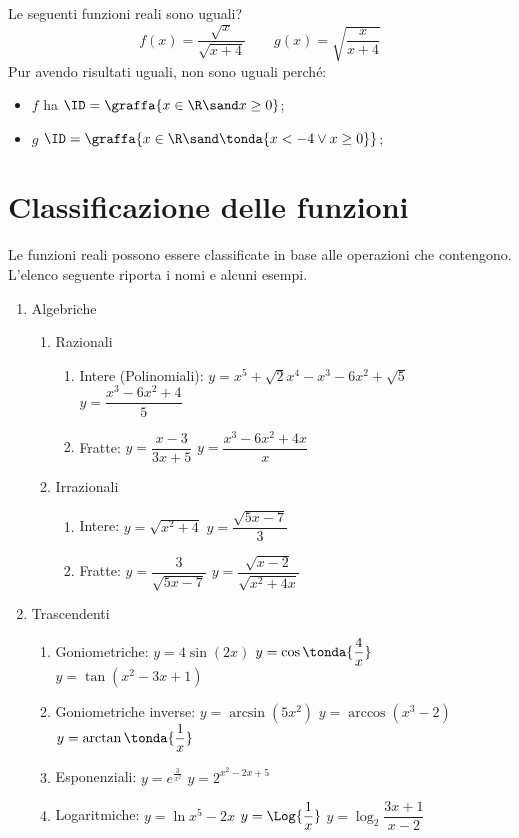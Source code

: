 \begin{esempio}
Le seguenti funzioni reali sono uguali?
\[f(x)=\frac{\sqrt{x}}{\sqrt{x+4}} \qquad g(x)=\sqrt{\frac{x}{x+4}}\]
Pur avendo risultati uguali, non sono uguali perché:
\begin{itemize}[nosep]
\item \(f\) ha 
\(\ID =\graffa{x \in \R \sand x \geq 0}\);
\item \(g\) 
\(\ID =\graffa{x \in \R \sand \tonda{x < -4 \lor x \geq 0}}\);
\end{itemize}
\end{esempio}

\section{Classificazione delle funzioni}

Le funzioni reali possono essere classificate in base alle operazioni che 
contengono.
L'elenco seguente riporta i nomi e alcuni esempi.

\begin{enumerate}
\item Algebriche
  \begin{enumerate}[label*=\arabic*.]
  \item Razionali
    \begin{enumerate}[label*=\arabic*.]
    \item Intere (Polinomiali): \quad 
    \(y = x^5 +\sqrt{2}x^4 -x^3-6x^2 +\sqrt{5}\) \qquad 
    \(y = \dfrac{x^3-6x^2 +4}{5}\) 
    \item Fratte: \quad
    \(y = \dfrac{x -3}{3x+5}\) \qquad 
    \(y = \dfrac{x^3-6x^2 +4x}{x}\) 
    \end{enumerate}
  \item Irrazionali
    \begin{enumerate}[label*=\arabic*.]
    \item Intere: \quad 
    \(y = \sqrt{x^2 +4}\) \qquad 
    \(y = \dfrac{\sqrt{5x-7}}{3}\) 
    \item Fratte: \quad
    \(y = \dfrac{3}{\sqrt{5x-7}}\) \qquad 
    \(y = \dfrac{\sqrt{x-2}}{\sqrt{x^2 +4x}}\) 
    \end{enumerate}
  \end{enumerate}
\item Trascendenti
  \begin{enumerate}[label*=\arabic*.]
  \item Goniometriche: \quad
  \(y = 4 \sin(2 x)\) \qquad
  \(y = \cos\tonda{\dfrac{4}{x}}\) \qquad
  \(y = \tan(x^2 -3x +1)\) 
  \item Goniometriche inverse: \quad
  \(y = \arcsin(5 x^2)\) \quad
  \(y = \arccos(x^3-2)\) \quad
  \(y = \arctan\tonda{\dfrac{1}{x}}\) 
  \item Esponenziali: \quad
  \(y = e^{\frac{3}{x^2}}\) \qquad
  \(y = 2^{x^2-2x+5}\) \qquad
  \item Logaritmiche: \quad
  \(y = \ln{x^5-2x}\) \qquad
  \(y = \Log{\dfrac{1}{x}}\) \qquad
  \(y = \log_2{\dfrac{3x+1}{x-2}}\) \qquad
  \end{enumerate}
\end{enumerate}

